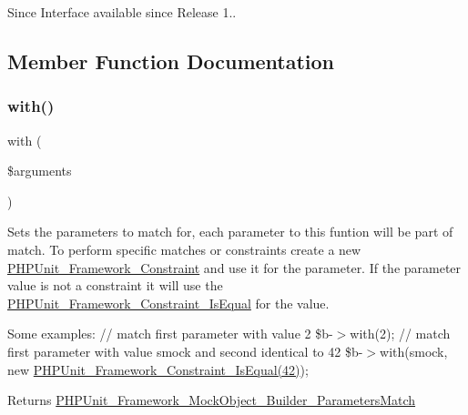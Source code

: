 \begin{DoxySince}{Since}
Interface available since Release 1.. 
\end{DoxySince}


\subsection{Member Function Documentation}
\mbox{\label{interface_p_h_p_unit___framework___mock_object___builder___parameters_match_a9197873aa58b8efb8b5570613a05632b}} 
\subsubsection{\texorpdfstring{with()}{with()}}
{\footnotesize\ttfamily with (\begin{DoxyParamCaption}\item[{}]{\$arguments }\end{DoxyParamCaption})}

Sets the parameters to match for, each parameter to this funtion will be part of match. To perform specific matches or constraints create a new \mbox{\hyperlink{class_p_h_p_unit___framework___constraint}{P\+H\+P\+Unit\+\_\+\+Framework\+\_\+\+Constraint}} and use it for the parameter. If the parameter value is not a constraint it will use the \mbox{\hyperlink{class_p_h_p_unit___framework___constraint___is_equal}{P\+H\+P\+Unit\+\_\+\+Framework\+\_\+\+Constraint\+\_\+\+Is\+Equal}} for the value.

Some examples\+: {\ttfamily  // match first parameter with value 2 \$b-\/$>$with(2); // match first parameter with value \textquotesingle{}smock\textquotesingle{} and second identical to 42 \$b-\/$>$with(\textquotesingle{}smock\textquotesingle{}, new \mbox{\hyperlink{class_p_h_p_unit___framework___constraint___is_equal}{P\+H\+P\+Unit\+\_\+\+Framework\+\_\+\+Constraint\+\_\+\+Is\+Equal(42)}}); }

\begin{DoxyReturn}{Returns}
\mbox{\hyperlink{interface_p_h_p_unit___framework___mock_object___builder___parameters_match}{P\+H\+P\+Unit\+\_\+\+Framework\+\_\+\+Mock\+Object\+\_\+\+Builder\+\_\+\+Parameters\+Match}} 
\end{DoxyReturn}


